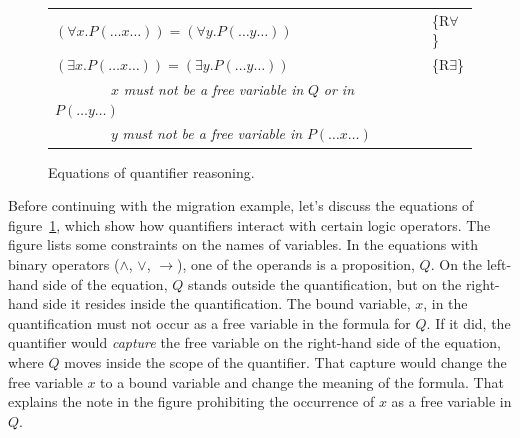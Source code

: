{{\begin{figure}
\begin{center}
\begin{tabular}{ll}
$(\forall x.P(\dots x \dots)) = (\forall y.P(\dots y \dots))$                                     & \{R$\forall$\} \\
$(\exists x.P(\dots x \dots)) = (\exists y.P(\dots y \dots))$                                     & \{R$\exists$\} \\
~~~~~~~~$x$ \emph{must not be a free variable in} $Q$ \emph{or in} $P(\dots y \dots)$     & \\
~~~~~~~~$y$ \emph{must not be a free variable in} $P(\dots x \dots)$                      & \\
\end{tabular}
\end{center}
\caption{Equations of quantifier reasoning.}
\label{fig-02-quantifiers}
\end{figure}

Before continuing with the migration example,
let's discuss the equations of figure~\ref{fig-02-quantifiers},
which show how quantifiers interact with certain logic operators.
The figure lists some constraints on the names of variables.
In the equations with binary operators ($\wedge$, $\vee$, $\rightarrow$),
one of the operands
is a proposition, $Q$.
On the left-hand side of the equation,
$Q$ stands outside the quantification, but
on the right-hand side it resides inside the quantification.
The bound variable, $x$, in the quantification
must not occur as a free variable in the formula for $Q$.
If it did, the quantifier would
\emph{capture}
the free variable on the right-hand side of the equation,
where $Q$ moves inside the scope of the quantifier.
That capture would change the free variable $x$ to a bound variable
and change the meaning of the formula.
That explains the note in the figure prohibiting the occurrence of $x$ as
a free variable in $Q$.

}}
